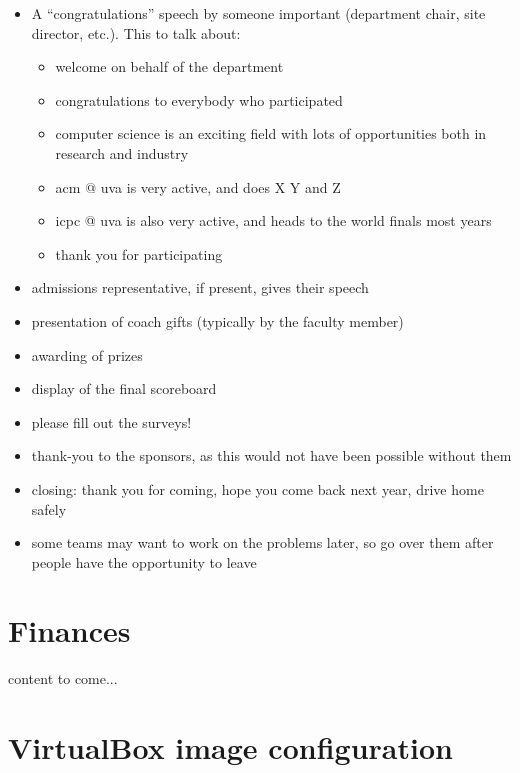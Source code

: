 \documentclass[11pt,twoside,letterpaper]{book}
\newenvironment{itemlist}{
\begin{itemize}
\setlength{\itemsep}{0pt}
\setlength{\parskip}{0pt}}
{\end{itemize}}
\begin{document}
\begin{itemlist}
\item A ``congratulations'' speech by someone important (department
chair, site director, etc.).  This to talk about:
\begin{itemlist}
\item welcome on behalf of the department
\item congratulations to everybody who participated
\item computer science is an exciting field with lots of opportunities
both in research and industry
\item acm @ uva is very active, and does X Y and Z
\item icpc @ uva is also very active, and heads to the world finals
  most years
\item thank you for participating
\end{itemlist}

\item admissions representative, if present, gives their speech
\item presentation of coach gifts (typically by the faculty member)
\item awarding of prizes
\item display of the final scoreboard
\item please fill out the surveys!
\item thank-you to the sponsors, as this would not have been possible
without them
\item closing: thank you for coming, hope you come back next year,
drive home safely
\item some teams may want to work on the problems later, so go over
them after people have the opportunity to leave
\end{itemlist}

\cleardoublepage
\chapter{Finances}

content to come...


\appendix
\renewcommand\chaptername{Appendix}

\cleardoublepage
\chapter{VirtualBox image configuration}
\label{appendix:vb-image}

\end{document}
